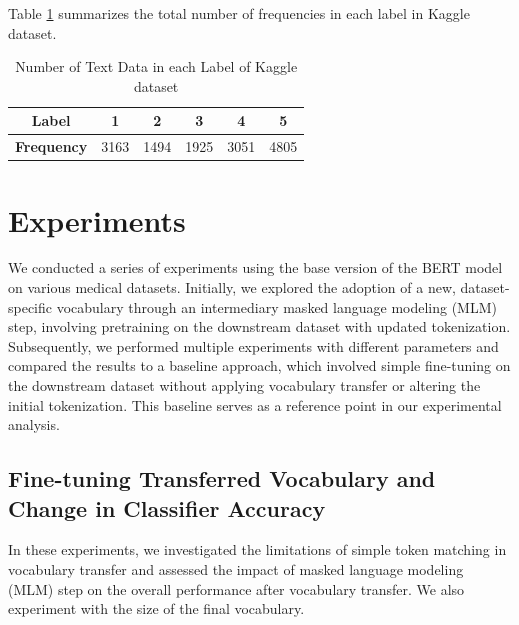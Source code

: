 \documentclass[11pt]{article}
\begin{document}
Table \ref{tab:label table} summarizes the total number of frequencies in each label in Kaggle dataset.
\begin{table}[htbp]
\centering 

\begin{tabular}{c| c c c c c}
    \hline
    \textbf{Label} & 1 & 2 & 3 & 4 & 5 \\
    \hline
    \textbf{Frequency} & 3163 & 1494 & 1925 & 3051 & 4805\\
    \hline
\end{tabular}
\caption{Number of Text Data in each Label of Kaggle dataset }
\label{tab:label table}
\end{table}

\section{Experiments}

We conducted a series of experiments using the base version of the BERT model on various medical datasets. Initially, we explored the adoption of a new, dataset-specific vocabulary through an intermediary masked language modeling (MLM) step, involving pretraining on the downstream dataset with updated tokenization. Subsequently, we performed multiple experiments with different parameters and compared the results to a baseline approach, which involved simple fine-tuning on the downstream dataset without applying vocabulary transfer or altering the initial tokenization. This baseline serves as a reference point in our experimental analysis.


\subsection{Fine-tuning Transferred Vocabulary and Change in Classifier Accuracy}

In these experiments, we investigated the limitations of simple token matching in vocabulary transfer and assessed the impact of masked language modeling (MLM) step on the overall performance after vocabulary transfer. We also experiment with the size of the final vocabulary.
\end{document}
